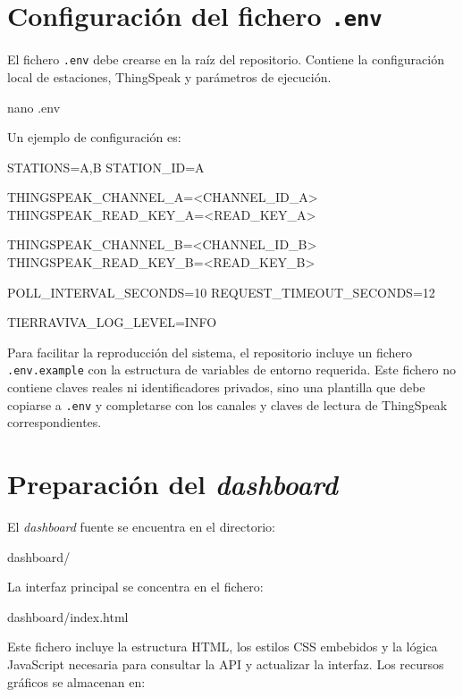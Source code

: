 \section{Configuración del fichero \texttt{.env}}

El fichero \texttt{.env} debe crearse en la raíz del repositorio. Contiene la configuración local de estaciones, ThingSpeak y parámetros de ejecución.

\begin{bashcode}
nano .env
\end{bashcode}

Un ejemplo de configuración es:

\begin{bashcode}
STATIONS=A,B
STATION_ID=A

THINGSPEAK_CHANNEL_A=<CHANNEL_ID_A>
THINGSPEAK_READ_KEY_A=<READ_KEY_A>

THINGSPEAK_CHANNEL_B=<CHANNEL_ID_B>
THINGSPEAK_READ_KEY_B=<READ_KEY_B>

POLL_INTERVAL_SECONDS=10
REQUEST_TIMEOUT_SECONDS=12

TIERRAVIVA_LOG_LEVEL=INFO
\end{bashcode}

Para facilitar la reproducción del sistema, el repositorio incluye un fichero \texttt{.env.example} con la estructura de variables de entorno requerida. Este fichero no contiene claves reales ni identificadores privados, sino una plantilla que debe copiarse a \texttt{.env} y completarse con los canales y claves de lectura de ThingSpeak correspondientes.

\section{Preparación del \textit{dashboard}}

El \textit{dashboard} fuente se encuentra en el directorio:

\begin{terminaloutput}
dashboard/
\end{terminaloutput}

La interfaz principal se concentra en el fichero:

\begin{terminaloutput}
dashboard/index.html
\end{terminaloutput}

Este fichero incluye la estructura HTML, los estilos CSS embebidos y la lógica JavaScript necesaria para consultar la API y actualizar la interfaz. Los recursos gráficos se almacenan en:

